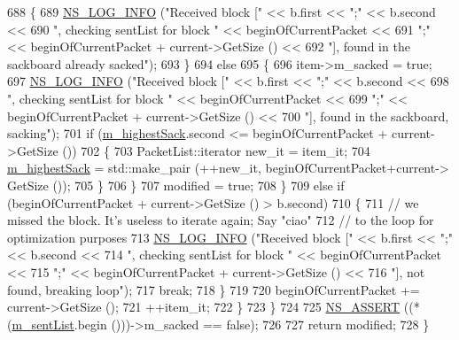 \begin{DoxyCode}
688                 \{
689                   \hyperlink{group__logging_gafbd73ee2cf9f26b319f49086d8e860fb}{NS\_LOG\_INFO} (\textcolor{stringliteral}{"Received block ["} << b.first << \textcolor{stringliteral}{";"} << b.second <<
690                                \textcolor{stringliteral}{", checking sentList for block "} << beginOfCurrentPacket <<
691                                \textcolor{stringliteral}{";"} << beginOfCurrentPacket + current->GetSize () <<
692                                \textcolor{stringliteral}{"], found in the sackboard already sacked"});
693                 \}
694               \textcolor{keywordflow}{else}
695                 \{
696                   item->m\_sacked = \textcolor{keyword}{true};
697                   \hyperlink{group__logging_gafbd73ee2cf9f26b319f49086d8e860fb}{NS\_LOG\_INFO} (\textcolor{stringliteral}{"Received block ["} << b.first << \textcolor{stringliteral}{";"} << b.second <<
698                                \textcolor{stringliteral}{", checking sentList for block "} << beginOfCurrentPacket <<
699                                \textcolor{stringliteral}{";"} << beginOfCurrentPacket + current->GetSize () <<
700                                \textcolor{stringliteral}{"], found in the sackboard, sacking"});
701                   \textcolor{keywordflow}{if} (\hyperlink{classns3_1_1TcpTxBuffer_a224ded405afbf30d8828c8ddd16b29d9}{m\_highestSack}.second <= beginOfCurrentPacket + current->GetSize ())
702                     \{
703                       PacketList::iterator new\_it = item\_it;
704                       \hyperlink{classns3_1_1TcpTxBuffer_a224ded405afbf30d8828c8ddd16b29d9}{m\_highestSack} = std::make\_pair (++new\_it, beginOfCurrentPacket+current->
      GetSize ());
705                     \}
706                 \}
707               modified = \textcolor{keyword}{true};
708             \}
709           \textcolor{keywordflow}{else} \textcolor{keywordflow}{if} (beginOfCurrentPacket + current->GetSize () > b.second)
710             \{
711               \textcolor{comment}{// we missed the block. It's useless to iterate again; Say "ciao"}
712               \textcolor{comment}{// to the loop for optimization purposes}
713               \hyperlink{group__logging_gafbd73ee2cf9f26b319f49086d8e860fb}{NS\_LOG\_INFO} (\textcolor{stringliteral}{"Received block ["} << b.first << \textcolor{stringliteral}{";"} << b.second <<
714                            \textcolor{stringliteral}{", checking sentList for block "} << beginOfCurrentPacket <<
715                            \textcolor{stringliteral}{";"} << beginOfCurrentPacket + current->GetSize () <<
716                            \textcolor{stringliteral}{"], not found, breaking loop"});
717               \textcolor{keywordflow}{break};
718             \}
719 
720           beginOfCurrentPacket += current->GetSize ();
721           ++item\_it;
722         \}
723     \}
724 
725   \hyperlink{assert_8h_a6dccdb0de9b252f60088ce281c49d052}{NS\_ASSERT} ((*(\hyperlink{classns3_1_1TcpTxBuffer_ae131f4743f4537f3606db664874440e5}{m\_sentList}.begin ()))->m\_sacked == \textcolor{keyword}{false});
726 
727   \textcolor{keywordflow}{return} modified;
728 \}
\end{DoxyCode}


